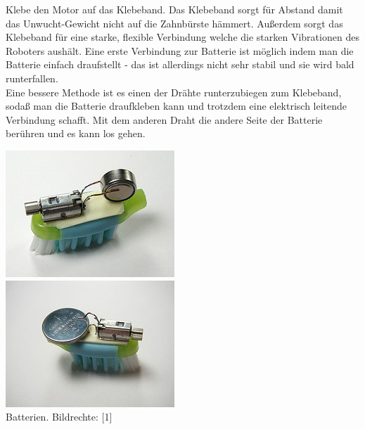 Klebe den Motor auf das Klebeband. Das Klebeband sorgt für Abstand damit das Unwucht-Gewicht nicht auf die Zahnbürste hämmert. Außerdem sorgt das Klebeband für eine starke, flexible Verbindung welche die starken Vibrationen des Roboters aushält. Eine erste Verbindung zur Batterie ist möglich indem man die Batterie einfach draufstellt - das ist allerdings nicht sehr stabil und sie wird bald runterfallen.
\\ 

Eine bessere Methode ist es einen der Drähte runterzubiegen zum Klebeband, sodaß man die Batterie draufkleben kann und trotzdem eine elektrisch leitende Verbindung schafft. Mit dem anderen Draht die andere Seite der Batterie berühren und es kann los gehen. \\

\begin{center}
\includegraphics[width=\linewidth]{bristlebot/bristlebot11.jpg}\\
\includegraphics[width=\linewidth]{bristlebot/bristlebot13.jpg}\\
\footnotesize{Batterien. Bildrechte: [1]}
\end{center}
